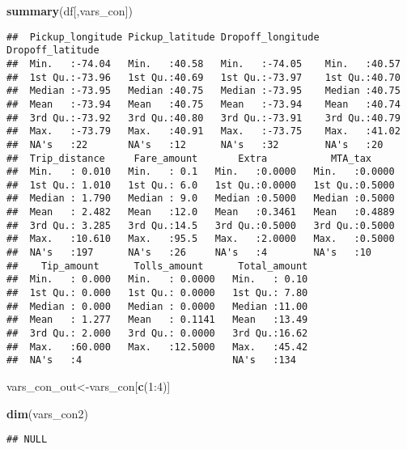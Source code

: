 \documentclass[]{article}
\newenvironment{Shaded}{\begin{snugshade}}{\end{snugshade}}
\newcommand{\KeywordTok}[1]{\textcolor[rgb]{0.13,0.29,0.53}{\textbf{{#1}}}}
\newcommand{\DecValTok}[1]{\textcolor[rgb]{0.00,0.00,0.81}{{#1}}}
\newcommand{\NormalTok}[1]{{#1}}
\begin{document}
\begin{Shaded}
\begin{Highlighting}[]
\KeywordTok{summary}\NormalTok{(df[,vars_con])}
\end{Highlighting}
\end{Shaded}

\begin{verbatim}
##  Pickup_longitude Pickup_latitude Dropoff_longitude Dropoff_latitude
##  Min.   :-74.04   Min.   :40.58   Min.   :-74.05    Min.   :40.57   
##  1st Qu.:-73.96   1st Qu.:40.69   1st Qu.:-73.97    1st Qu.:40.70   
##  Median :-73.95   Median :40.75   Median :-73.95    Median :40.75   
##  Mean   :-73.94   Mean   :40.75   Mean   :-73.94    Mean   :40.74   
##  3rd Qu.:-73.92   3rd Qu.:40.80   3rd Qu.:-73.91    3rd Qu.:40.79   
##  Max.   :-73.79   Max.   :40.91   Max.   :-73.75    Max.   :41.02   
##  NA's   :22       NA's   :12      NA's   :32        NA's   :20      
##  Trip_distance     Fare_amount       Extra           MTA_tax      
##  Min.   : 0.010   Min.   : 0.1   Min.   :0.0000   Min.   :0.0000  
##  1st Qu.: 1.010   1st Qu.: 6.0   1st Qu.:0.0000   1st Qu.:0.5000  
##  Median : 1.790   Median : 9.0   Median :0.5000   Median :0.5000  
##  Mean   : 2.482   Mean   :12.0   Mean   :0.3461   Mean   :0.4889  
##  3rd Qu.: 3.285   3rd Qu.:14.5   3rd Qu.:0.5000   3rd Qu.:0.5000  
##  Max.   :10.610   Max.   :95.5   Max.   :2.0000   Max.   :0.5000  
##  NA's   :197      NA's   :26     NA's   :4        NA's   :10      
##    Tip_amount      Tolls_amount      Total_amount  
##  Min.   : 0.000   Min.   : 0.0000   Min.   : 0.10  
##  1st Qu.: 0.000   1st Qu.: 0.0000   1st Qu.: 7.80  
##  Median : 0.000   Median : 0.0000   Median :11.00  
##  Mean   : 1.277   Mean   : 0.1141   Mean   :13.49  
##  3rd Qu.: 2.000   3rd Qu.: 0.0000   3rd Qu.:16.62  
##  Max.   :60.000   Max.   :12.5000   Max.   :45.42  
##  NA's   :4                          NA's   :134
\end{verbatim}

\begin{Shaded}
\begin{Highlighting}[]
\NormalTok{vars_con_out<-vars_con[}\KeywordTok{c}\NormalTok{(}\DecValTok{1}\NormalTok{:}\DecValTok{4}\NormalTok{)]}

\KeywordTok{dim}\NormalTok{(vars_con2)}
\end{Highlighting}
\end{Shaded}

\begin{verbatim}
## NULL
\end{verbatim}
\end{document}
